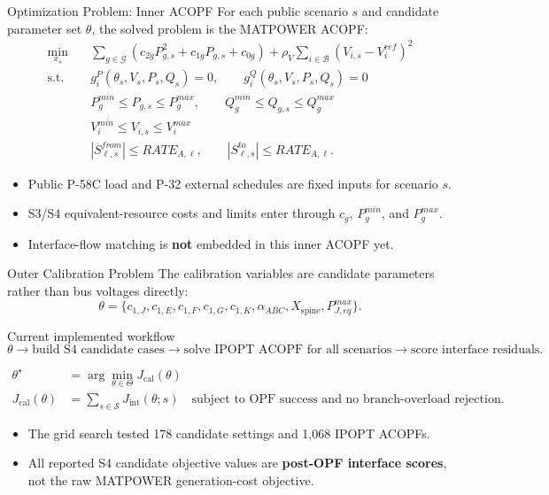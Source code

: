 \documentclass[aspectratio=169,10pt]{beamer}
\begin{document}
\begin{frame}{Optimization Problem: Inner ACOPF}
\small
For each public scenario $s$ and candidate parameter set $\theta$, the solved problem is the MATPOWER ACOPF:
\vspace{-0.2em}
\scriptsize
\begin{align*}
\min_{x_s}\quad
& \sum_{g \in \mathcal{G}}
\left(c_{2g}P_{g,s}^2 + c_{1g}P_{g,s} + c_{0g}\right)
+ \rho_V \sum_{i \in \mathcal{B}} (V_{i,s}-V_i^{ref})^2 \\[0.25em]
\text{s.t.}\quad
& g_i^P(\theta_s,V_s,P_s,Q_s)=0,\qquad
  g_i^Q(\theta_s,V_s,P_s,Q_s)=0 \\
& P_g^{min} \le P_{g,s} \le P_g^{max},\qquad
  Q_g^{min} \le Q_{g,s} \le Q_g^{max} \\
& V_i^{min} \le V_{i,s} \le V_i^{max} \\
& |S_{\ell,s}^{from}| \le RATE_{A,\ell},\qquad
  |S_{\ell,s}^{to}| \le RATE_{A,\ell}.
\end{align*}

\normalsize
\begin{itemize}
  \item Public P-58C load and P-32 external schedules are fixed inputs for scenario $s$.
  \item S3/S4 equivalent-resource costs and limits enter through $c_g$, $P_g^{min}$, and $P_g^{max}$.
  \item Interface-flow matching is \textbf{not} embedded in this inner ACOPF yet.
\end{itemize}
\end{frame}

\begin{frame}{Outer Calibration Problem}
\small
The calibration variables are candidate parameters rather than bus voltages directly:
\[
\theta =
\{c_{1,J}, c_{1,E}, c_{1,F}, c_{1,G}, c_{1,K},
\alpha_{ABC}, X_{\mathrm{spine}}, P^{max}_{J,eq}\}.
\]

\vspace{-0.4em}
\begin{block}{Current implemented workflow}
\[
\theta \rightarrow
\text{build S4 candidate cases} \rightarrow
\text{solve IPOPT ACOPF for all scenarios} \rightarrow
\text{score interface residuals}.
\]
\end{block}

\vspace{-0.2em}
\scriptsize
\begin{align*}
\theta^\star
&= \arg\min_{\theta \in \Theta}
J_{\mathrm{cal}}(\theta) \\
J_{\mathrm{cal}}(\theta)
&= \sum_{s \in \mathcal{S}} J_{\mathrm{int}}(\theta;s)
\quad \text{subject to OPF success and no branch-overload rejection.}
\end{align*}

\normalsize
\begin{itemize}
  \item The grid search tested 178 candidate settings and 1,068 IPOPT ACOPFs.
  \item All reported S4 candidate objective values are \textbf{post-OPF interface scores}, not the raw MATPOWER generation-cost objective.
\end{itemize}
\end{frame}
\end{document}
